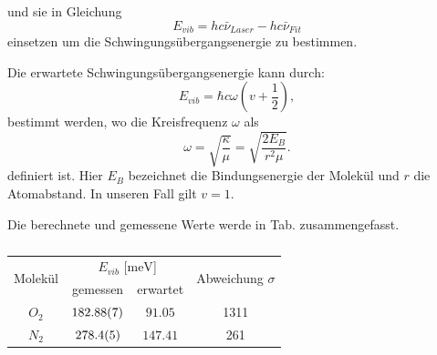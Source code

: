 \documentclass[11 pt]{article}
\begin{document}
und sie in Gleichung
\begin{equation}
E_{vib} = hc\bar{\nu}_{Laser}- hc\bar{\nu}_{Fit}
\end{equation}
einsetzen um die Schwingungsübergangsenergie zu bestimmen. 

Die erwartete Schwingungsübergangsenergie kann durch:
\begin{equation}
E_{vib} = \hbar c \omega \left( v + \dfrac{1}{2} \right),
\end{equation}
bestimmt werden, wo die Kreisfrequenz $\omega$ als 
\begin{equation}
\omega = \sqrt{\dfrac{\kappa}{\mu}} = \sqrt{\dfrac{2E_{B}}{r^2\mu}}.
\end{equation}
definiert ist. Hier $E_B$ bezeichnet die Bindungsenergie der Molekül und $r$ die Atomabstand. In unseren Fall gilt $v = 1$. 

Die berechnete und gemessene Werte werde in Tab.  zusammengefasst. 

\begin{table}[!htbp]
 \begin{center}
  \caption{}
  \label{tab:generic_table}
  \renewcommand{\arraystretch}{1.3}
  \begin{tabular}{|c|c|c|c|}
  \hline

\multirow{2}{*}{Molekül}& \multicolumn{2}{c|}{$E_{vib}$ [$\unit{\milli\electronvolt}$]} &  \multirow{2}{*}{ Abweichung $\sigma$} \\ \cline{2-3} %
 					 & gemessen & erwartet &    			\\
  \hline
  \hline
  $O_2$	&	$\num{182.88 \pm 0.07}$	&	$\num{91.05}$ &	1311\\
  $N_2$	&	$\num{278.4 \pm 0.5}$	&	$\num{147.41}$&	261\\ 
  \hline
  \end{tabular}
  \renewcommand{\arraystretch}{1}
 \end{center}
\end{table}
\end{document}
